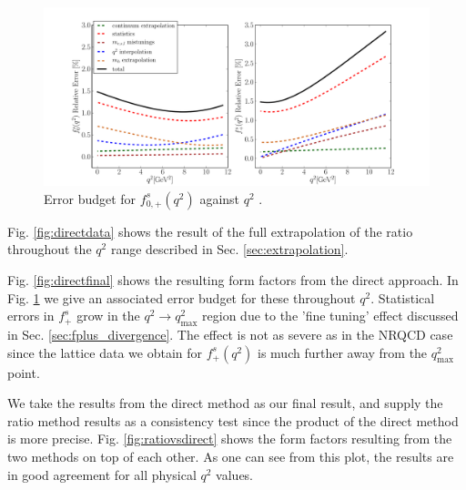 \begin{figure}[htb!]
  \hspace{-85pt}
  \includegraphics[width=1.4\textwidth]{images/BsDs/direct/errorbudget.pdf}
  \caption{ Error budget for $f_{0,+}^s(q^2)$ against $q^2$ \label{fig:directerrorbudget}.}
\end{figure}

Fig. \ref{fig:directdata} shows the result of the full extrapolation of the ratio throughout the $q^2$ range described in Sec. \ref{sec:extrapolation}.

Fig. \ref{fig:directfinal} shows the resulting form factors from the direct approach. In Fig. \ref{fig:directerrorbudget} we give an associated error budget for these throughout $q^2$. Statistical errors in $f^s_+$ grow in the $q^2\to q^2_{\text{max}}$ region due to the 'fine tuning' effect discussed in Sec. \ref{sec:fplus_divergence}. The effect is not as severe as in the NRQCD case since the lattice data we obtain for $f^s_+(q^2)$ is much further away from the $q^2_{\text{max}}$ point.

We take the results from the direct method as our final result, and supply the ratio method results as a consistency test since the product of the direct method is more precise. Fig. \ref{fig:ratiovsdirect} shows the form factors resulting from the two methods on top of each other. As one can see from this plot, the results are in good agreement for all physical $q^2$ values.

